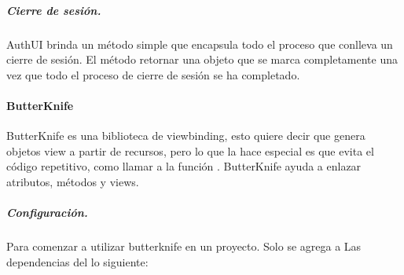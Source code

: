 \subparagraph{Cierre de sesión.}
\label{\detokenize{dev_docs:cierre-de-sesion}}
AuthUI brinda un método  simple que encapsula todo el proceso
que conlleva un cierre de sesión. El método retornar una objeto 
que se marca completamente una vez que todo el proceso de cierre de sesión
se ha completado.

%
\begin{sphinxVerbatim}[commandchars=\\\{\}]
  
              
                     
                      
                      
\end{sphinxVerbatim}


\paragraph{ButterKnife}
\label{\detokenize{dev_docs:butterknife}}
ButterKnife es una biblioteca de viewbinding, esto quiere decir que genera
objetos view a partir de recursos, pero lo que la hace especial es que evita
el código repetitivo, como llamar a la función . ButterKnife
ayuda a enlazar atributos, métodos y views.


\subparagraph{Configuración.}
\label{\detokenize{dev_docs:id1}}
Para comenzar a utilizar butterknife en un proyecto. Solo se agrega a Las
dependencias del  lo siguiente:


